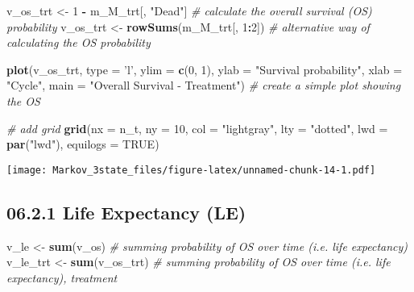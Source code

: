 \documentclass[
]{article}
\newenvironment{Shaded}{\begin{snugshade}}{\end{snugshade}}
\newcommand{\CommentTok}[1]{\textcolor[rgb]{0.56,0.35,0.01}{\textit{#1}}}
\newcommand{\DataTypeTok}[1]{\textcolor[rgb]{0.13,0.29,0.53}{#1}}
\newcommand{\DecValTok}[1]{\textcolor[rgb]{0.00,0.00,0.81}{#1}}
\newcommand{\KeywordTok}[1]{\textcolor[rgb]{0.13,0.29,0.53}{\textbf{#1}}}
\newcommand{\NormalTok}[1]{#1}
\newcommand{\OperatorTok}[1]{\textcolor[rgb]{0.81,0.36,0.00}{\textbf{#1}}}
\newcommand{\OtherTok}[1]{\textcolor[rgb]{0.56,0.35,0.01}{#1}}
\newcommand{\StringTok}[1]{\textcolor[rgb]{0.31,0.60,0.02}{#1}}
\begin{document}
\begin{Shaded}
\begin{Highlighting}[]
\NormalTok{v_os_trt <-}\StringTok{ }\DecValTok{1} \OperatorTok{-}\StringTok{ }\NormalTok{m_M_trt[, }\StringTok{"Dead"}\NormalTok{]     }\CommentTok{# calculate the overall survival (OS) probability}
\NormalTok{v_os_trt <-}\StringTok{ }\KeywordTok{rowSums}\NormalTok{(m_M_trt[, }\DecValTok{1}\OperatorTok{:}\DecValTok{2}\NormalTok{])   }\CommentTok{# alternative way of calculating the OS probability}

\KeywordTok{plot}\NormalTok{(v_os_trt, }\DataTypeTok{type =} \StringTok{'l'}\NormalTok{, }
     \DataTypeTok{ylim =} \KeywordTok{c}\NormalTok{(}\DecValTok{0}\NormalTok{, }\DecValTok{1}\NormalTok{),}
     \DataTypeTok{ylab =} \StringTok{"Survival probability"}\NormalTok{,}
     \DataTypeTok{xlab =} \StringTok{"Cycle"}\NormalTok{,}
     \DataTypeTok{main =} \StringTok{"Overall Survival - Treatment"}\NormalTok{)       }\CommentTok{# create a simple plot showing the OS}

\CommentTok{# add grid }
\KeywordTok{grid}\NormalTok{(}\DataTypeTok{nx =}\NormalTok{ n_t, }\DataTypeTok{ny =} \DecValTok{10}\NormalTok{, }\DataTypeTok{col =} \StringTok{"lightgray"}\NormalTok{, }\DataTypeTok{lty =} \StringTok{"dotted"}\NormalTok{, }\DataTypeTok{lwd =} \KeywordTok{par}\NormalTok{(}\StringTok{"lwd"}\NormalTok{), }
     \DataTypeTok{equilogs =} \OtherTok{TRUE}\NormalTok{) }
\end{Highlighting}
\end{Shaded}

\texttt{[image: Markov\_3state\_files/figure-latex/unnamed-chunk-14-1.pdf]}

\hypertarget{life-expectancy-le}{%
\subsection{06.2.1 Life Expectancy (LE)}\label{life-expectancy-le}}

\begin{Shaded}
\begin{Highlighting}[]
\NormalTok{v_le     <-}\StringTok{ }\KeywordTok{sum}\NormalTok{(v_os)      }\CommentTok{# summing probability of OS over time (i.e. life expectancy)}
\NormalTok{v_le_trt <-}\StringTok{ }\KeywordTok{sum}\NormalTok{(v_os_trt)  }\CommentTok{# summing probability of OS over time (i.e. life expectancy), treatment}
\end{Highlighting}
\end{Shaded}
\end{document}
